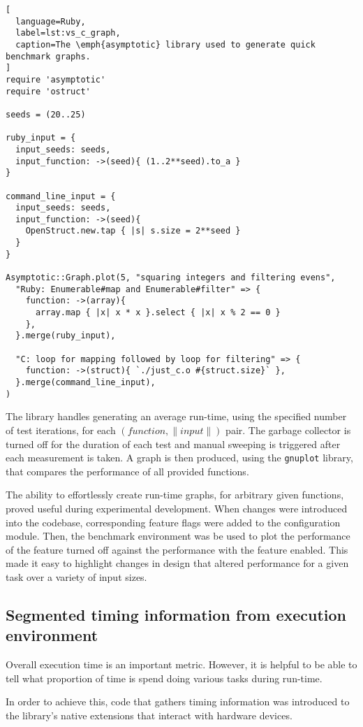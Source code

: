 \begin{lstlisting}[
  language=Ruby,
  label=lst:vs_c_graph,
  caption=The \emph{asymptotic} library used to generate quick benchmark graphs.
]
require 'asymptotic'
require 'ostruct'

seeds = (20..25)

ruby_input = {
  input_seeds: seeds,
  input_function: ->(seed){ (1..2**seed).to_a }
}

command_line_input = {
  input_seeds: seeds,
  input_function: ->(seed){
    OpenStruct.new.tap { |s| s.size = 2**seed }
  }
}

Asymptotic::Graph.plot(5, "squaring integers and filtering evens",
  "Ruby: Enumerable#map and Enumerable#filter" => {
    function: ->(array){
      array.map { |x| x * x }.select { |x| x % 2 == 0 } 
    },
  }.merge(ruby_input),

  "C: loop for mapping followed by loop for filtering" => {
    function: ->(struct){ `./just_c.o #{struct.size}` },
  }.merge(command_line_input),
)
\end{lstlisting}

The library handles generating an average run-time, using the specified number of test iterations, for each $(function, \|input\|)$ pair.
The garbage collector is turned off for the duration of each test and manual sweeping is triggered after each measurement is taken.
A graph is then produced, using the \verb|gnuplot| library, that compares the performance of all provided functions.

The ability to effortlessly create run-time graphs, for arbitrary given functions, proved useful during experimental development.
When changes were introduced into the codebase, corresponding feature flags were added to the configuration module.
Then, the benchmark environment was be used to plot the performance of the feature turned off against the performance with the feature enabled.
This made it easy to highlight changes in design that altered performance for a given task over a variety of input sizes.

\subsection{Segmented timing information from execution environment}
Overall execution time is an important metric. However, it is helpful to be able to tell what proportion of time is spend doing various tasks during run-time.

In order to achieve this, code that gathers timing information was introduced to the library's native extensions that interact with hardware devices.

